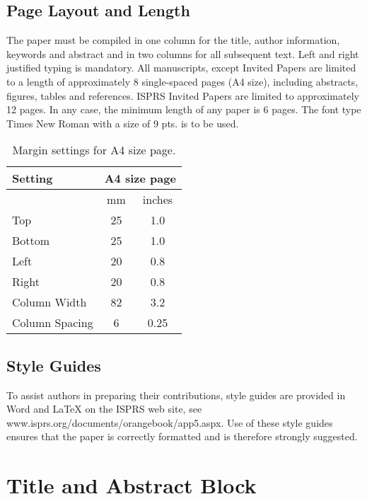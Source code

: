 \documentclass{isprs} %
\begin{document}
\subsection{Page Layout and Length}\label{sec:Page Layout, Spacing and Margins}
The paper must be compiled in one column for the title, author information, keywords and abstract and in two columns for all subsequent text. Left and right justified typing is mandatory. All manuscripts, except Invited Papers are limited to a length of approximately 8 single-spaced pages (A4 size), including abstracts, figures, tables and references. ISPRS Invited Papers are limited to approximately 12 pages. In any case, the minimum length of any paper is 6 pages. The font type Times New Roman with a size of 9 pts. is to be used.

\begin{table}[h]
	\centering
		\begin{tabular}{|l|c|c|}\hline
			Setting&\multicolumn{2}{c|}{A4 size page}\\\hline
			  &mm&inches\\
			 Top&25&1.0\\
			 Bottom&25&1.0\\
			 Left&20&0.8\\
			 Right&20&0.8\\
			 Column Width&82&3.2\\
			 Column Spacing&6&0.25\\\hline
		\end{tabular}
	\caption{Margin settings for A4 size page.}
\label{tab:Margin_settings}
\end{table}

\subsection{Style Guides}\label{sec:Preparation in electronic form}

To assist authors in preparing their contributions, style guides are provided in Word and LaTeX on the ISPRS web site, see www.isprs.org/documents/orangebook/app5.aspx. Use of these style guides ensures that the paper is correctly formatted and is therefore strongly suggested.


\section{Title and Abstract Block}\label{sec:TITLE AND ABSTRACT BLOCK}
\end{document}
